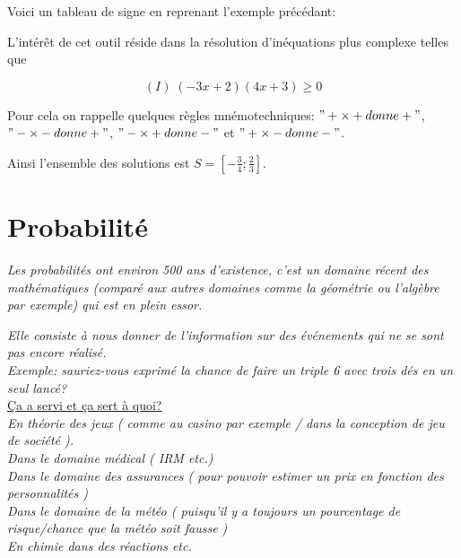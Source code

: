 \documentclass[french]{book}
\begin{document}
Voici un tableau de signe en reprenant l'exemple précédant:
\begin{center}
\end{center}

L'intérêt de cet outil réside dans la résolution d'inéquations plus complexe telles que 

$$(I) \;  (-3x+2)(4x+3)\geq 0$$

Pour cela on rappelle quelques règles mnémotechniques: $"+ \times + donne +"$, $"- \times - donne +"$, $"- \times + donne -"$ et $"+ \times - donne -"$.  

\begin{center}
\end{center}

Ainsi l'ensemble des solutions est 
$ S= [-\frac{3}{4}; \frac{2}{3}] $.



\chapter{Probabilité}

\textit{Les probabilités ont environ 500 ans d'existence, c'est un domaine récent des mathématiques (comparé aux autres domaines comme la géométrie ou l'algèbre par exemple) qui est en plein essor.}

\textit{Elle consiste à nous donner de l'information sur des événements qui ne se sont pas encore réalisé.}\\ 

\textit{Exemple: sauriez-vous exprimé la chance de faire un triple 6 avec trois dés en un seul lancé?}\\


\underline{Ça a servi et ça sert à quoi? }\\

\textit{En théorie des jeux ( comme au casino par exemple / dans la conception de jeu de société ). \\
Dans le domaine médical ( IRM etc.)\\ 
Dans le domaine des assurances ( pour pouvoir estimer un prix en fonction des personnalités )\\
Dans le domaine de la météo ( puisqu’il y a toujours un pourcentage de risque/chance que la météo soit fausse )\\
En chimie dans des réactions etc.}\\
\end{document}
